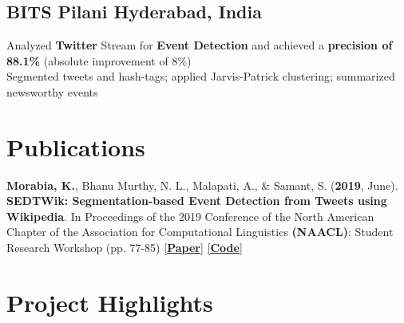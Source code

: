 \documentclass[]{Resume}
\begin{document}
\subsection{BITS Pilani \hfill \normalfont Hyderabad, India}
\pt Analyzed \textbf{Twitter} Stream for \textbf{Event Detection} and achieved a \textbf{precision of 88.1\%} (absolute improvement of 8\%) \\
\pt Segmented tweets and hash-tags; applied Jarvis-Patrick clustering; summarized newsworthy events 
\sectionsep


\section{Publications} 
\hrulefill 

\textbf{Morabia, K.}, Bhanu Murthy, N. L., Malapati, A., \& Samant, S. (\textbf{2019}, June). \textbf{SEDTWik: Segmentation-based Event Detection from Tweets using Wikipedia}. In Proceedings of the 2019 Conference of the North American Chapter of the Association for Computational Linguistics \textbf{(NAACL)}: Student Research Workshop (pp. 77-85) \href{https://www.aclweb.org/anthology/N19-3011/}{[\textbf{Paper}]} \href{https://github.com/kevalmorabia97/SEDTWik-Event-Detection-from-Tweets}{[\textbf{Code}]}
\sectionsep

\section{Project Highlights}
\hrulefill
\end{document}
